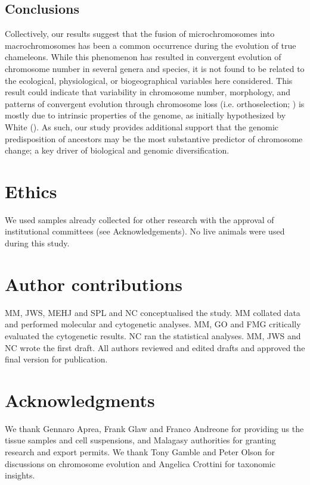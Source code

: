 \documentclass[a4paper, 12pt]{article}
\begin{document}
\subsection{Conclusions}
Collectively, our results suggest that the fusion of microchromosomes into macrochromosomes has been a common occurrence during the evolution of true chameleons. 
While this phenomenon has resulted in convergent evolution of chromosome number in several genera and species, it is not found to be related to the ecological, physiological, or biogeographical variables here considered. 
This result could indicate that variability in chromosome number, morphology, and patterns of convergent evolution through chromosome loss (i.e. orthoselection; \citealt{white1973}) is mostly due to intrinsic properties of the genome, as initially hypothesized by White (\citeyear{white1975chromosome}). 
As such, our study provides additional support that the genomic predisposition of ancestors may be the most substantive predictor of chromosome change; a key driver of biological and genomic diversification.

\section{Ethics}
We used samples already collected for other research with the approval of institutional committees (see Acknowledgements). No live animals were used during this study.

\section{Author contributions}
MM, JWS, MEHJ and SPL and NC conceptualised the study. MM collated data and performed molecular and cytogenetic analyses. MM, GO and FMG critically evaluated the cytogenetic results. NC ran the statistical analyses. MM, JWS and NC wrote the first draft. All authors reviewed and edited drafts and approved the final version for publication.

\section{Acknowledgments}
We thank Gennaro Aprea, Frank Glaw and Franco Andreone for providing us the tissue samples and cell suspensions, and Malagasy authorities for granting research and export permits. We thank Tony Gamble and Peter Olson for discussions on chromosome evolution and Angelica Crottini for taxonomic insights.
\end{document}
